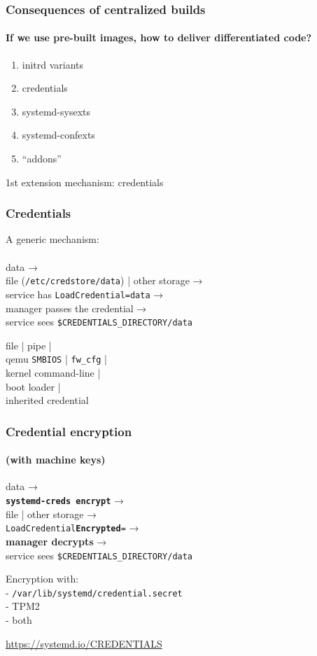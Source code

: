 \documentclass[]{beamer}
\newcommand\pp\pause
\begin{document}
\begin{frame}
  \frametitle{Consequences of centralized builds}
  \framesubtitle{If we use pre-built images, how to deliver differentiated code?}
  \pp

  \begin{enumerate}
    \addtocounter{enumi}{-1}
  \item initrd variants\pp
  \item credentials\pp
  \item systemd-sysexts\pp
  \item systemd-confexts\pp
  \item ``addons''
  \end{enumerate}


\end{frame}

\begin{frame}
  1st extension mechanism: credentials
\end{frame}

\begin{frame}
  \frametitle{Credentials}
  \pp

  A generic mechanism:\\\\
  data → \\
  file (\texttt{/etc/credstore/data}) | other storage → \\
  service has \texttt{LoadCredential=data} → \\
  manager passes the credential → \\
  service sees \texttt{\$CREDENTIALS\_DIRECTORY/data}

  \pp
  \quad

  file | pipe | \\
  qemu \texttt{SMBIOS} | \texttt{fw\_cfg} | \\
  kernel command-line | \\
  boot loader | \\
  inherited credential
\end{frame}

\begin{frame}[fragile]
  \frametitle{Credential encryption}
  \framesubtitle{(with machine keys)}

  \pp
  data → \\
  \textbf{\texttt{systemd-creds encrypt}} → \\
  file | other storage → \\
  \texttt{LoadCredential\textbf{Encrypted}=} → \\
  \textbf{manager decrypts} → \\
  service sees \texttt{\$CREDENTIALS\_DIRECTORY/data}

  \pp
  \quad

  Encryption with:\\
  - \texttt{/var/lib/systemd/credential.secret}
  \\
  - TPM2
  \\
  - both

  \vfill

  \small
  \url{https://systemd.io/CREDENTIALS}
\end{frame}
\end{document}
